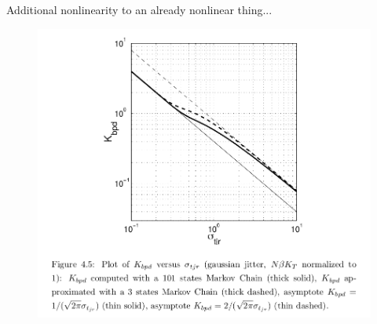 \documentclass[t, screen, aspectratio=43]{beamer}
\begin{document}
\begin{frame}
\begin{block}{Additional nonlinearity to an already nonlinear thing...}
\begin{minipage}{6cm}
		\end{minipage}%
		\begin{minipage}{6cm}
			\begin{figure}[htb!]
			        \centering
			        \includegraphics[width=1\textwidth, angle=0]{kbbpd}
			\end{figure}
		\end{minipage}%

	\end{block}	
\end{frame}
\end{document}
